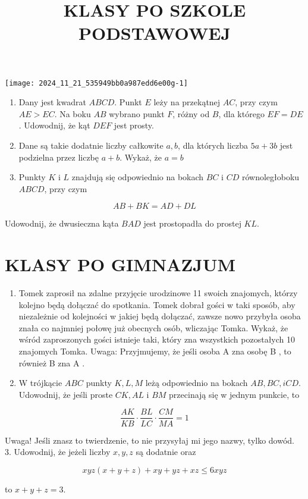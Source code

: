 \documentclass[10pt]{article}
\title{KLASY PO SZKOLE PODSTAWOWEJ }
\author{}
\date{}
\begin{document}
\maketitle
\begin{center}
\texttt{[image: 2024\_11\_21\_535949bb0a987edd6e00g-1]}
\end{center}

\begin{enumerate}
  \item Dany jest kwadrat \(A B C D\). Punkt \(E\) leży na przekątnej \(A C\), przy czym \(A E>E C\). Na boku \(A B\) wybrano punkt \(F\), różny od \(B\), dla którego \(E F=D E\). Udowodnij, że kąt \(D E F\) jest prosty.
  \item Dane są takie dodatnie liczby całkowite \(a, b\), dla których liczba \(5 a+3 b\) jest podzielna przez liczbę \(a+b\). Wykaż, że \(a=b\)
  \item Punkty \(K\) i \(L\) znajdują się odpowiednio na bokach \(B C\) i \(C D\) równoległoboku \(A B C D\), przy czym
\end{enumerate}

\[
A B+B K=A D+D L
\]

Udowodnij, że dwusieczna kąta \(B A D\) jest prostopadła do prostej \(K L\).

\section*{KLASY PO GIMNAZJUM}
\begin{enumerate}
  \item Tomek zaprosił na zdalne przyjęcie urodzinowe 11 swoich znajomych, którzy kolejno będą dołączać do spotkania. Tomek dobrał gości w taki sposób, aby niezależnie od kolejności w jakiej będą dołączać, zawsze nowo przybyła osoba znała co najmniej połowę już obecnych osób, wliczając Tomka. Wykaż, że wśród zaproszonych gości istnieje taki, który zna wszystkich pozostałych 10 znajomych Tomka. Uwaga: Przyjmujemy, że jeśli osoba A zna osobę B , to również B zna A .
  \item W trójkącie \(A B C\) punkty \(K, L, M\) leżą odpowiednio na bokach \(A B, B C, i C D\). Udowodnij, że jeśli proste \(C K, A L\) i \(B M\) przecinają się w jednym punkcie, to
\end{enumerate}

\[
\frac{A K}{K B} \cdot \frac{B L}{L C} \cdot \frac{C M}{M A}=1
\]

Uwaga! Jeśli znasz to twierdzenie, to nie przysyłaj mi jego nazwy, tylko dowód.\\
3. Udowodnij, że jeżeli liczby \(x, y, z\) są dodatnie oraz

\[
x y z(x+y+z)+x y+y z+x z \leq 6 x y z
\]

to \(x+y+z=3\).
\end{document}
